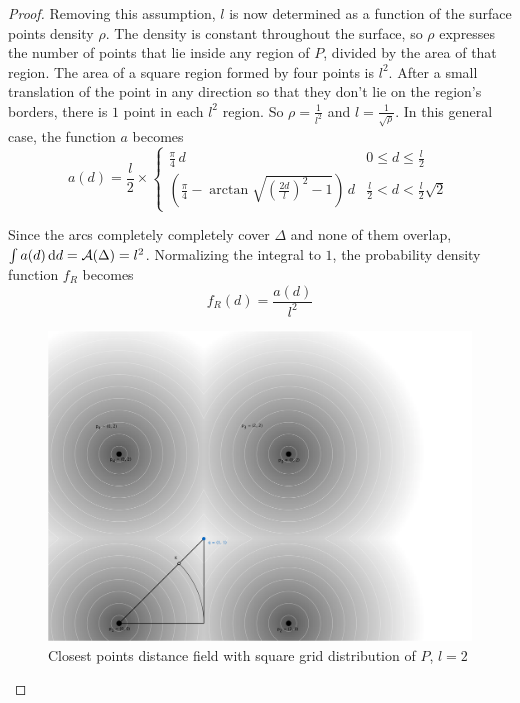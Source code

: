 \begin{proof}
Removing this assumption, $l$ is now determined as a function of the surface points density $\rho$. The density is constant throughout the surface, so $\rho$ expresses the number of points that lie inside any region of $P$, divided by the area of that region. The area of a square region formed by four points is $l^2$. After a small translation of the point in any direction so that they don't lie on the region's borders, there is $1$ point in each $l^2$ region. So $\rho = \frac{1}{l^2}$ and $l = \frac{1}{\sqrt{\rho}}$. In this general case, the function $a$ becomes
\begin{equation}
a(d) = \frac{l}{2} \times \begin{cases}
	\frac{\pi}{4} \, d & 0 \leq d \leq \frac{l}{2} \\
	\left( \frac{\pi}{4} - \arctan{\sqrt{\left( \frac{2d}{l} \right)^2 - 1}} \right) \, d & \frac{l}{2} < d < \frac{l}{2} \sqrt{2}
\end{cases}
\end{equation}

Since the arcs completely completely cover $\Delta$ and none of them overlap, $\int a(d) \, \mathrm{d} d = \mathcal{A}(\Delta) = l^2$. Normalizing the integral to $1$, the probability density function $f_R$ becomes
\begin{equation}
f_R(d) = \frac{a(d)}{l^2}
\end{equation}

\begin{figure}[h]
\centering
\includegraphics[width=.8\textwidth]{fig/sq_grid.pdf}
\caption{Closest points distance field with square grid distribution of $P$, $l = 2$}
\label{fig:sq_grid}
\end{figure}

\end{proof}
